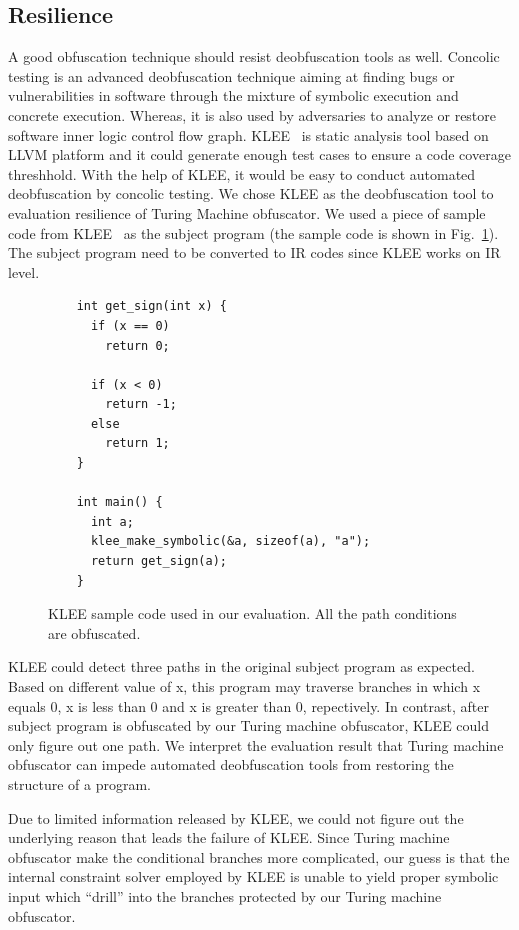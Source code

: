 \documentclass[lnicst]{svmultln}
\newcommand{\F}{Fig.}
\begin{document}
\subsection{Resilience}
\label{subsec:resilience}
A good obfuscation technique should resist deobfuscation tools as well. Concolic
testing is an advanced deobfuscation technique aiming at finding bugs or
vulnerabilities in software through the mixture of symbolic execution and
concrete execution. Whereas, it is also used by adversaries to analyze or
restore software inner logic control flow graph\cite{Cadar,Sen,Cute}. KLEE~\cite{klee} is static analysis
tool based on LLVM platform and it could generate enough test cases to ensure a
code coverage threshhold. With the help of KLEE, it would be easy to conduct
automated deobfuscation by concolic testing. We chose KLEE as the deobfuscation
tool to evaluation resilience of Turing Machine obfuscator. We used a piece of
sample code from KLEE~\cite{klee} as the subject program (the sample code is
shown in \F~\ref{fig:klee-sample}). The subject program need to be converted to
IR codes since KLEE works on IR level.

\begin{figure}[h]
\centering
\begin{lstlisting}
    int get_sign(int x) {
      if (x == 0)
        return 0; 

      if (x < 0)
        return -1;
      else 
        return 1;
    }

    int main() {
      int a;
      klee_make_symbolic(&a, sizeof(a), "a");
      return get_sign(a);
    }
\end{lstlisting}
\caption{KLEE sample code used in our evaluation. All the path conditions are obfuscated.}
\label{fig:klee-sample}
\end{figure}


KLEE could detect three paths in the original subject program as expected. Based
on different value of x, this program may traverse branches in which x equals 0,
x is less than 0 and x is greater than 0, repectively. In contrast, after
subject program is obfuscated by our Turing machine obfuscator, KLEE could only
figure out one path. We interpret the evaluation result that Turing machine
obfuscator can impede automated deobfuscation tools from restoring the structure
of a program.

Due to limited information released by KLEE, we could not figure out the
underlying reason that leads the failure of KLEE. Since Turing machine
obfuscator make the conditional branches more complicated, our guess is that the
internal constraint solver employed by KLEE is unable to yield proper symbolic
input which ``drill'' into the branches protected by our Turing machine
obfuscator.
\end{document}
